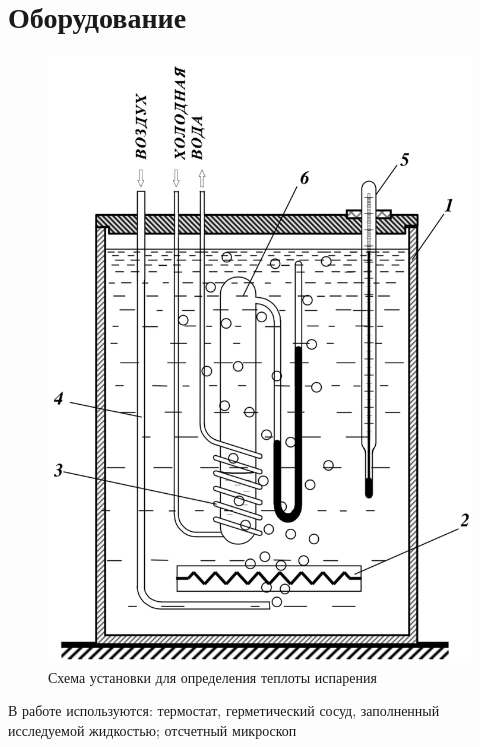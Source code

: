 \documentclass[a4paper,12pt]{article}
\theoremstyle{plain} %
\theoremstyle{definition} %
\theoremstyle{remark} %
\begin{document}
\section{Оборудование}
\begin{figure}
	\includegraphics[width=\linewidth]{1}
	\captionsetup{justification=centering}
	\caption{Схема установки для определения теплоты испарения}
\end{figure}
В работе используются: термостат, герметический сосуд, заполненный исследуемой жидкостью; отсчетный микроскоп
\end{document}
